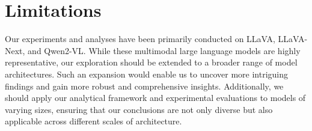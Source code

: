 \section{Limitations}
Our experiments and analyses have been primarily conducted on LLaVA, LLaVA-Next, and Qwen2-VL. While these multimodal large language models are highly representative, our exploration should be extended to a broader range of model architectures. Such an expansion would enable us to uncover more intriguing findings and gain more robust and comprehensive insights. Additionally, we should apply our analytical framework and experimental evaluations to models of varying sizes, ensuring that our conclusions are not only diverse but also applicable across different scales of architecture.